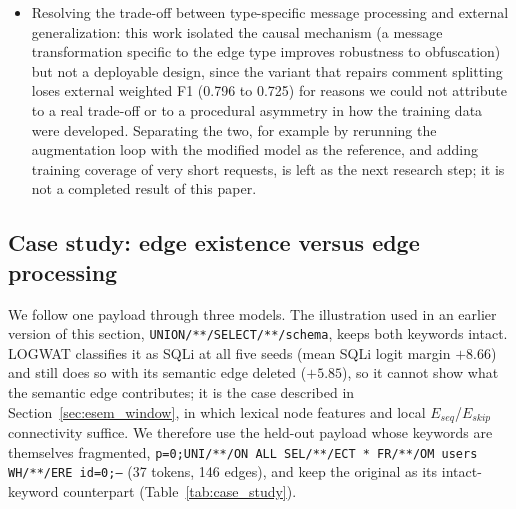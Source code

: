 \begin{itemize}
    \item Resolving the trade-off between type-specific message processing and external generalization: this work isolated the causal mechanism (a message transformation specific to the edge type improves robustness to obfuscation) but not a deployable design, since the variant that repairs comment splitting loses external weighted F1 (0.796 to 0.725) for reasons we could not attribute to a real trade-off or to a procedural asymmetry in how the training data were developed. Separating the two, for example by rerunning the augmentation loop with the modified model as the reference, and adding training coverage of very short requests, is left as the next research step; it is not a completed result of this paper.
\end{itemize}

\subsection{Case study: edge existence versus edge processing}
\label{sec:case_study}

We follow one payload through three models. The illustration used in an earlier version of this section, \texttt{UNION/**/SELECT/**/schema}, keeps both keywords intact. LOGWAT classifies it as SQLi at all five seeds (mean SQLi logit margin $+8.66$) and still does so with its semantic edge deleted ($+5.85$), so it cannot show what the semantic edge contributes; it is the case described in Section~\ref{sec:esem_window}, in which lexical node features and local $E_{seq}$/$E_{skip}$ connectivity suffice. We therefore use the held-out payload whose keywords are themselves fragmented, \texttt{p=0;UNI/**/ON ALL SEL/**/ECT * FR/**/OM users WH/**/ERE id=0;--} (37 tokens, 146 edges), and keep the original as its intact-keyword counterpart (Table~\ref{tab:case_study}).

